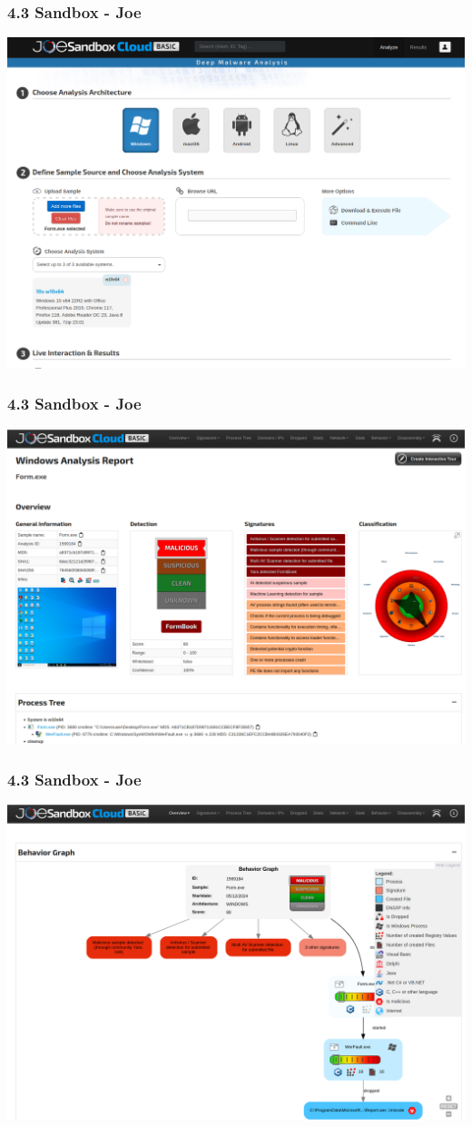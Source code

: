 \begin{frame}[fragile]
  \frametitle{4.3 Sandbox - Joe}
  \includegraphics[scale=0.22]{images/joe1.png}
\end{frame}


\begin{frame}[fragile]
  \frametitle{4.3 Sandbox - Joe}
  \includegraphics[scale=0.21]{images/joe2.png}
\end{frame}


\begin{frame}[fragile]
  \frametitle{4.3 Sandbox - Joe}
  \includegraphics[scale=0.21]{images/joe3.png}
\end{frame}


